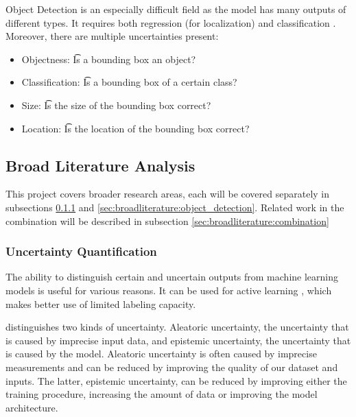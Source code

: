 Object Detection is an especially difficult field as the model has many outputs of different types. It requires both regression (for localization) and classification \cite{Gasperini_2022}. Moreover, there are multiple uncertainties present:
\begin{itemize}
    \item Objectness: \t Is a bounding box an object?  \label{prop:Objectness}
    \item Classification: \t Is a bounding box of a certain class? \label{prop:Classification}
    \item Size: \t Is the size of the bounding box correct? \label{prop:Size}
    \item Location: \t Is the location of the bounding box correct? \label{prop:Location}
\end{itemize}


\subsection{Broad Literature Analysis}\label{sec:broadliterature}

This project covers broader research areas, each will be covered separately in subsections \ref{sec:broadliterature:uncertainty} and \ref{sec:broadliterature:object_detection}. Related work in the combination will be described in subsection \ref{sec:broadliterature:combination}

\subsubsection{Uncertainty Quantification}\label{sec:broadliterature:uncertainty}
The ability to distinguish certain and uncertain outputs from machine learning models is useful for various reasons. It can be used for active learning \cite{yang2009effective,settles2009active,houlsby2011bayesian,Bernhardt_2022}, which makes better use of limited labeling capacity.

\citep{gal2016uncertainty} distinguishes two kinds of uncertainty. Aleatoric uncertainty, the uncertainty that is caused by imprecise input data, and epistemic uncertainty, the uncertainty that is caused by the model. Aleatoric uncertainty is often caused by imprecise measurements and can be reduced by improving the quality of our dataset and inputs. The latter, epistemic uncertainty, can be reduced by improving either the training procedure, increasing the amount of data or improving the model architecture.

